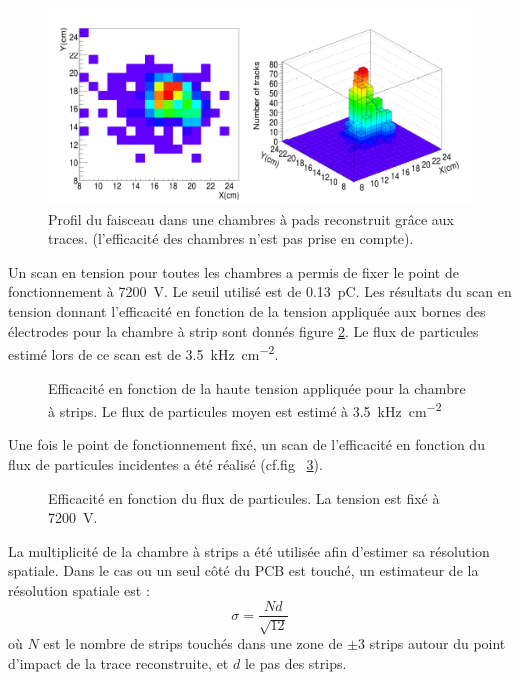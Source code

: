 \begin{figure}[ht!]
	\centering
	\includegraphics[width=0.83\linewidth]{GLA/FaisceauPS.png}
	\caption{Profil du faisceau dans une chambres à pads reconstruit grâce aux traces. (l'efficacité des chambres n'est pas prise en compte).}
	\label{faisceauPS}
\end{figure}

Un scan en tension pour toutes les chambres a permis de fixer le point de fonctionnement à \SI{7200}{\volt}. Le seuil utilisé est de \SI{0.13}{\pico\coulomb}. Les résultats du scan en tension donnant l'efficacité en fonction de la tension appliquée aux bornes des électrodes pour la chambre à strip sont donnés figure \ref{ScanTensionPS}. Le flux de particules estimé lors de ce scan est de \SI{3.5}{\kilo\hertz\per\square\centi\meter}.

\begin{figure}[!ht]
	\centering
	\scalebox{1.4}{}
	\caption{Efficacité en fonction de la haute tension appliquée pour la chambre à strips. Le flux de particules moyen est estimé à \SI{3.5}{\kilo\hertz\per\square\centi\meter}}
	\label{ScanTensionPS}
\end{figure}

Une fois le point de fonctionnement fixé, un scan de l'efficacité en fonction du flux de particules incidentes a été réalisé (cf.fig~ \ref{ScanRatePS}).

\begin{figure}[!ht]
	\centering
	\scalebox{1.4}{}
	\caption{Efficacité en fonction du flux de particules. La tension est fixé à \SI{7200}{\volt}.}
	\label{ScanRatePS}
\end{figure}

La multiplicité de la chambre à strips a été utilisée afin d'estimer sa résolution spatiale. Dans le cas ou un seul côté du PCB est touché, un estimateur de la résolution spatiale est :
\begin{equation}
\sigma=\frac{Nd}{\sqrt{12}}
\end{equation}
où $N$ est le nombre de strips touchés dans une zone de $\pm 3$ strips autour du point d’impact de la trace reconstruite, et $d$ le pas des strips.

